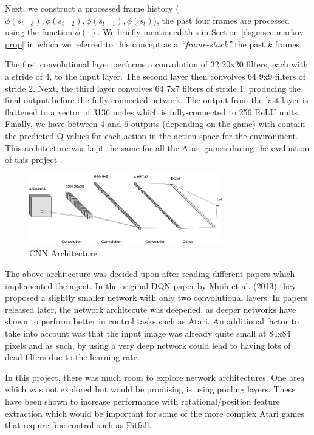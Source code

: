 Next, we construct a processed frame history ($\phi(s_{t-3}), \phi(s_{t-2}), \phi(s_{t-1}), \phi(s_t)$), the past four frames are processed using the function $\phi(\cdot)$. We briefly mentioned this in Section \ref{dsgn:sec:markov-prop} in which we referred to this concept as a \textit{``frame-stack''} the past $k$ frames.

The first convolutional layer performs a convolution of 32 20x20 filters, each with a stride of 4, to the input layer. The second layer then convolves 64 9x9 filters of stride 2. Next, the third layer convolves 64 7x7 filters of stride 1, producing the final output before the fully-connected network. The output from the last layer is flattened to a vector of 3136 nodes which is fully-connected to 256 ReLU units. Finally, we have between 4 and 6 outputs (depending on the game) with contain the predicted Q-values for each action in the action space for the environment. This architecture was kept the same for all the Atari games during the evaluation of this project \cite{dqn}.

\begin{figure}[htbp]
  \centering
  \includegraphics[width=0.75\textwidth]{chapters/chapter4/images/cnn.png}
  \caption{CNN Architecture
    \label{fig:project-dqn}
  }
\end{figure}

The above architecture was decided upon after reading different papers which implemented the agent. In the original DQN paper by Mnih et al. (2013) \cite{dqn} they proposed a slightly smaller network with only two convolutional layers. In papers released later, the network architecute was deepened, as deeper networks have shown to perform better in control tasks such as Atari. An additional factor to take into account was that the input image was already quite small at 84x84 pixels and as such, by using a very deep network could lead to having lots of dead filters due to the learning rate.

In this project, there was much room to explore network architectures. One area which was not explored but would be promising is using pooling layers. These have been shown to increase performance with rotational/position feature extraction which would be important for some of the more complex Atari games that require fine control such as Pitfall.

